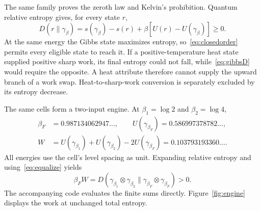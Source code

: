 \documentclass[11pt,a4paper]{article}
\begin{document}
The same family proves the zeroth law and Kelvin's prohibition. Quantum relative entropy gives, for every state $r$,
\begin{equation}
 D(r\|\gamma_\beta)=s(\gamma_\beta)-s(r)+\beta[U(r)-U(\gamma_\beta)]\ge0. \label{eq:gibbsD}
\end{equation}
At the same energy the Gibbs state maximizes entropy, so~\eqref{eq:closedorder} permits every eligible state to reach it. If a positive-temperature heat state supplied positive sharp work, its final entropy could not fall, while~\eqref{eq:gibbsD} would require the opposite. A heat attribute therefore cannot supply the upward branch of a work swap. Heat-to-sharp-work conversion is separately excluded by its entropy decrease.

The same cells form a two-input engine. At $\beta_1=\log2$ and $\beta_2=\log4$,
\begin{equation}
\begin{split}
 \beta_F&=0.987134062947\ldots,\qquad U(\gamma_{\beta_F})=0.586997378782\ldots,\\
 W&=U(\gamma_{\beta_1})+U(\gamma_{\beta_2})-2U(\gamma_{\beta_F})
   =0.103793193360\ldots .
\end{split} \label{eq:engine}
\end{equation}
All energies use the cell's level spacing as unit. Expanding relative entropy and using~\eqref{eq:equalize} yields
\begin{equation}
 \beta_FW=D(\gamma_{\beta_1}\otimes\gamma_{\beta_2}\|\gamma_{\beta_F}\otimes\gamma_{\beta_F})>0. \label{eq:engineD}
\end{equation}
The accompanying code evaluates the finite sums directly. Figure~\ref{fig:engine} displays the work at unchanged total entropy.
\end{document}
